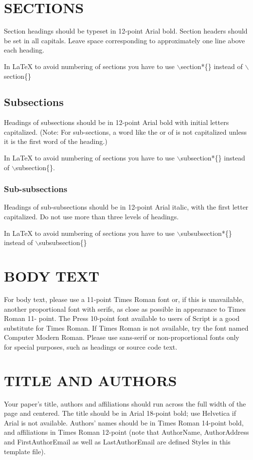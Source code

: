 \documentclass[11pt]{article}
\begin{document}
\section*{SECTIONS}
Section headings should be typeset in 12-point Arial bold. Section headers should be set
in all capitals. Leave space corresponding to approximately one line above each heading.

In LaTeX to avoid numbering of sections you have to use $\backslash$section*\{\} instead of $\backslash$section\{\}
\subsection*{Subsections}
Headings of subsections should be in 12-point Arial bold with initial letters capitalized.
(Note: For sub-sections, a word like the or of is not capitalized unless it is the first word
of the heading.)

In LaTeX to avoid numbering of sections you have to use $\backslash$subsection*\{\} instead of $\backslash$subsection\{\}.
\subsubsection*{Sub-subsections}
Headings of sub-subsections should be in 12-point Arial italic, with the first letter
capitalized. Do not use more than three levels of headings. 

In LaTeX to avoid numbering of sections you have to use $\backslash$subsubsection*\{\} instead of $\backslash$subsubsection\{\}
\section*{BODY TEXT}
For body text, please use a 11-point Times Roman font or, if this is unavailable, another
proportional font with serifs, as close as possible in appearance to Times Roman 11-
point. The Press 10-point font available to users of Script is a good substitute for Times
Roman. If Times Roman is not available, try the font named Computer Modern Roman.
Please use sans-serif or non-proportional fonts only for special purposes, such as
headings or source code text. 

\section*{TITLE AND AUTHORS}
Your paper’s title, authors and affiliations should run across the full width of the page
and centered. The title should be in Arial 18-point bold; use Helvetica if Arial is not
available. Authors’ names should be in Times Roman 14-point bold, and affiliations in
Times Roman 12-point (note that AuthorName, AuthorAddress and FirstAuthorEmail as
well as LastAuthorEmail are defined Styles in this template file).
\end{document}
